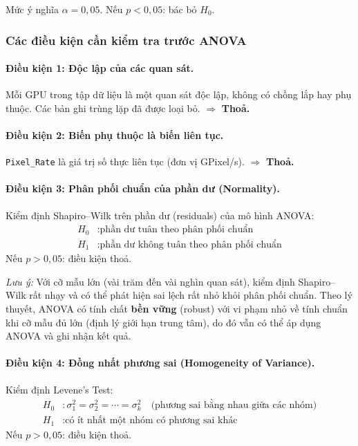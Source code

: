 Mức ý nghĩa $\alpha = 0{,}05$. Nếu $p < 0{,}05$: bác bỏ $H_0$.

\subsubsection{Các điều kiện cần kiểm tra trước ANOVA}

\paragraph{Điều kiện 1: Độc lập của các quan sát.}
Mỗi GPU trong tập dữ liệu là một quan sát độc lập, không có chồng lắp hay
phụ thuộc. Các bản ghi trùng lặp đã được loại bỏ. $\Rightarrow$ \textbf{Thoả.}

\paragraph{Điều kiện 2: Biến phụ thuộc là biến liên tục.}
\texttt{Pixel\_Rate} là giá trị số thực liên tục (đơn vị GPixel/s).
$\Rightarrow$ \textbf{Thoả.}

\paragraph{Điều kiện 3: Phân phối chuẩn của phần dư (Normality).}
Kiểm định Shapiro--Wilk trên phần dư (residuals) của mô hình ANOVA:
\begin{align*}
  H_0 &: \text{phần dư tuân theo phân phối chuẩn} \\
  H_1 &: \text{phần dư không tuân theo phân phối chuẩn}
\end{align*}
Nếu $p > 0{,}05$: điều kiện thoả.

\textit{Lưu ý:} Với cỡ mẫu lớn (vài trăm đến vài nghìn quan sát), kiểm định
Shapiro--Wilk rất nhạy và có thể phát hiện sai lệch rất nhỏ khỏi phân phối chuẩn.
Theo lý thuyết, ANOVA có tính chất \textbf{bền vững} (robust) với vi phạm nhỏ
về tính chuẩn khi cỡ mẫu đủ lớn (định lý giới hạn trung tâm), do đó vẫn có thể
áp dụng ANOVA và ghi nhận kết quả.

\paragraph{Điều kiện 4: Đồng nhất phương sai (Homogeneity of Variance).}
Kiểm định Levene's Test:
\begin{align*}
  H_0 &: \sigma_1^2 = \sigma_2^2 = \cdots = \sigma_k^2 \quad
         \text{(phương sai bằng nhau giữa các nhóm)} \\
  H_1 &: \text{có ít nhất một nhóm có phương sai khác}
\end{align*}
Nếu $p > 0{,}05$: điều kiện thoả.

